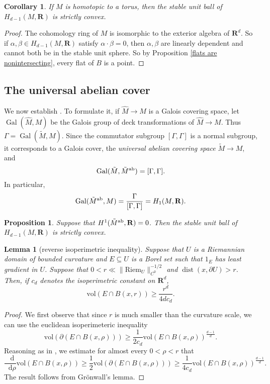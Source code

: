 \documentclass[reqno,11pt]{amsart}
\newcommand{\RR}{\mathbf{R}}
\newcommand*\dif{\mathop{}\!\mathrm{d}}
\DeclareMathOperator{\dist}{dist}
\newcommand{\vol}{\mathrm{vol}}
\DeclareMathOperator{\Gal}{Gal}
\newcommand{\Riem}{\mathrm{Riem}}
\newcommand{\dfn}[1]{\emph{#1}\index{#1}}
\newtheorem{lemma}[theorem]{Lemma}
\newtheorem{proposition}[theorem]{Proposition}
\newtheorem{corollary}[theorem]{Corollary}
\theoremstyle{definition}
\numberwithin{equation}{section}
\begin{document}
\begin{corollary}
If $M$ is homotopic to a torus, then the stable unit ball of $H_{d - 1}(M, \RR)$ is strictly convex.
\end{corollary}
\begin{proof}
The cohomology ring of $M$ is isomorphic to the exterior algebra of $\RR^d$.
So if $\alpha, \beta \in H_{d - 1}(M, \RR)$ satisfy $\alpha \cdot \beta = 0$, then $\alpha, \beta$ are linearly dependent and cannot both be in the stable unit sphere.
So by Proposition \ref{flats are nonintersecting}, every flat of $B$ is a point.
\end{proof}

\subsection{The universal abelian cover}
We now establish \cite[Theorem 7]{Auer01}.
To formulate it, if $\hat M \to M$ is a Galois covering space, let $\Gal(\hat M, M)$ be the Galois group of deck transformations of $\hat M \to M$.
Thus $\Gamma = \Gal(\tilde M, M)$.
Since the commutator subgroup $[\Gamma, \Gamma]$ is a normal subgroup, it corresponds to a Galois cover, the \dfn{universal abelian covering space} $\tilde M \to M$, and
$$\Gal(\tilde M, \tilde M^{\rm ab}) = [\Gamma, \Gamma].$$
In particular,
$$\Gal(\tilde M^{\rm ab}, M) = \frac{\Gamma}{[\Gamma, \Gamma]} = H_1(M, \RR).$$

\begin{proposition}\label{abelian cover condition}
Suppose that $H^1(\tilde M^{\rm ab}, \RR) = 0$. 
Then the stable unit ball of $H_{d - 1}(M, \RR)$ is strictly convex.
\end{proposition}

\begin{lemma}[reverse isoperimetric inequality]
Suppose that $U$ is a Riemannian domain of bounded curvature and $E \subseteq U$ is a Borel set such that $1_E$ has least gradient in $U$.
Suppose that $0 < r \ll \|\Riem_U\|_{C^0}^{-1/2}$ and $\dist(x, \partial U) > r$.
Then, if $c_d$ denotes the isoperimetric constant on $\RR^d$,
\begin{equation}\label{reverse isoperimetric inequality}
\vol(E \cap B(x, r)) \geq \frac{r^d}{4dc_d}.
\end{equation}
\end{lemma}
\begin{proof}
We first observe that since $r$ is much smaller than the curvature scale, we can use the euclidean isoperimeteric inequality 
$$\vol(\partial(E \cap B(x, \rho))) \geq \frac{1}{2c_d} \vol(E \cap B(x, \rho))^{\frac{d - 1}{d}}.$$
Reasoning as in \cite[Proposition 5.14]{Giusti77}, we estimate for almost every $0 < \rho < r$ that
$$\frac{\dif}{\dif \rho} \vol(E \cap B(x, \rho)) \geq \frac{1}{2} \vol(\partial(E \cap B(x, \rho))) \geq \frac{1}{4c_d} \vol(E \cap B(x, \rho))^{\frac{d - 1}{d}}.$$
The result follows from Gr\"onwall's lemma.
\end{proof}
\end{document}
